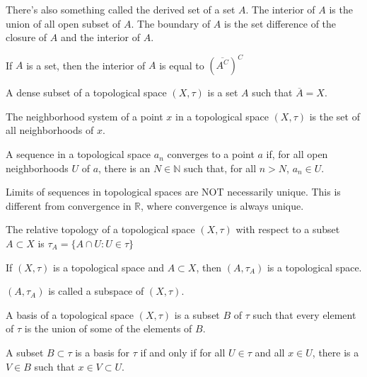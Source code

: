     There's also something called the derived
    set of a set $A$. The interior of $A$
    is the union of all open subset of $A$.
    The boundary of $A$ is the set difference
    of the closure of $A$ and the interior of
    $A$.
    \begin{theorem}
        If $A$ is a set, then
        the interior of $A$ is equal to
        $(\overline{A^{C}})^{C}$
    \end{theorem}
    \begin{definition}
        A dense subset of a topological
        space $(X,\tau)$ is a set $A$
        such that $\overline{A}=X$.
    \end{definition}
    \begin{definition}
        The neighborhood system of a point
        $x$ in a topological space $(X,\tau)$
        is the set of all neighborhoods of
        $x$.
    \end{definition}
    \begin{definition}
        A sequence in a topological space
        $a_{n}$ converges to a point $a$ if,
        for all open neighborhoods $U$ of $a$,
        there is an $N\in\mathbb{N}$ such that,
        for all $n>N$, $a_{n}\in{U}$.
    \end{definition}
    Limits of sequences in topological spaces are NOT
    necessarily unique. This is different from convergence
    in $\mathbb{R}$, where convergence is always unique.
    \begin{definition}
        The relative topology of a
        topological space $(X,\tau)$ with
        respect to a subset $A\subset{X}$
        is $\tau_{A}=\{A\cap{U}:U\in\tau\}$
    \end{definition}
    \begin{theorem}
        If $(X,\tau)$ is a topological space and
        $A\subset{X}$, then
        $(A,\tau_{A})$ is a topological space.
    \end{theorem}
    $(A,\tau_{A})$ is called a subspace of
    $(X,\tau)$.
    \begin{definition}
        A basis of a topological space
        $(X,\tau)$ is a subset $B$ of
        $\tau$ such that every element
        of $\tau$ is the union of some of the
        elements of $B$.
    \end{definition}
    \begin{theorem}
        A subset $B\subset\tau$ is a basis
        for $\tau$ if and only if for all
        $U\in\tau$ and all $x\in{U}$, there is
        a $V\in{B}$ such that
        $x\in{V}\subset{U}$.
    \end{theorem}
